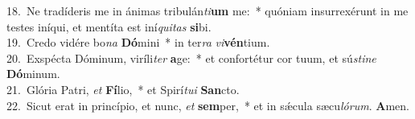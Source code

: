 {18.~}Ne tradíderis me in ánimas tribulán\textit{ti}\textbf{um} me:~* quóniam insurrexérunt in me testes iníqui, et mentíta est iní\textit{qui}\textit{tas} \textbf{si}bi.\\
{19.~}Credo vidére bo\textit{na} \textbf{Dó}mini~* in ter\textit{ra} \textit{vi}\textbf{vén}tium.\\
{20.~}Exspécta Dóminum, viríli\textit{ter} \textbf{a}ge:~* et confortétur cor tuum, et sú\textit{sti}\textit{ne} \textbf{Dó}minum.\\
{21.~}Glória Patri, \textit{et} \textbf{Fí}lio,~* et Spirí\textit{tu}\textit{i} \textbf{San}cto.\\
{22.~}Sicut erat in princípio, et nunc, \textit{et} \textbf{sem}per,~* et in sǽcula sæcu\textit{ló}\textit{rum}. \textbf{A}men.\\
